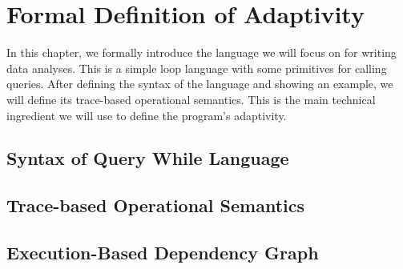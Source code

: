 \chapter{Formal Definition of Adaptivity}
\label{ch:adapt-definition}
In this chapter, we formally introduce the language we will focus on for writing data analyses.  
This is a simple loop language with some primitives for calling queries. 
After defining the syntax of the language and showing an example, we will define its trace-based operational semantics. This is the main technical ingredient we will use to define the program's adaptivity.

\section{Syntax of Query While Language}
\label{sec:adapt-syntax}

\section{ Trace-based Operational Semantics}
\label{sec:adapt-os}
%

\section{ Execution-Based Dependency Graph}
\label{sec:adapt_dynamic}
%
